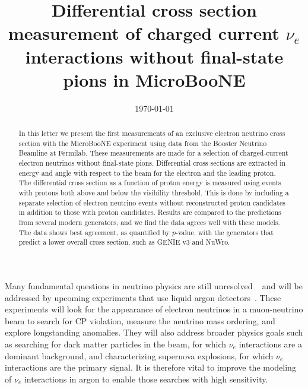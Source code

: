 \documentclass[reprint,
 amsmath,amssymb,
 aps,prd,
 superscriptaddress,
 twocolumn, longbibliography
]{revtex4-1}
\newcommand{\nue}{$\nu_e$\xspace}
\begin{document}
\title{Differential cross section measurement of charged current \nue interactions without final-state pions in MicroBooNE}



\date{\today}%

\begin{abstract}
In this letter we present the first measurements of an exclusive electron neutrino cross section with the MicroBooNE experiment using data from the Booster Neutrino Beamline at Fermilab. These measurements are made for a selection of charged-current electron neutrinos without final-state pions. Differential cross sections are extracted in energy and angle with respect to the beam for the electron and the leading proton.  The differential cross section as a function of proton energy is measured using events with protons both above and below the visibility threshold. This is done by including a separate selection of electron neutrino events without reconstructed proton candidates in addition to those with proton candidates.
Results are compared to the predictions from several modern generators, and we find the data agrees well with these models.  The data shows best agreement, as quantified by $p$-value, with the generators that predict a lower overall cross section,  such as GENIE v3 and NuWro.
\end{abstract}

\addtolength{\tabcolsep}{5pt}


\maketitle

Many fundamental questions in neutrino physics are still unresolved ~\cite{NuReview} and will be addressed by upcoming experiments that use liquid argon detectors~\cite{DUNE:2020ypp,SBN}. These experiments will look for the appearance of electron neutrinos in a muon-neutrino beam to search for CP violation, measure the neutrino mass ordering, and explore longstanding anomalies. They will also address broader physics goals such as searching for dark matter particles in the beam, for which $\nu_{e}$ interactions are a dominant background, and characterizing supernova explosions, for which $\nu_{e}$ interactions are the primary signal. It is therefore vital to improve the modeling of $\nu_{e}$ interactions in argon to enable those searches with high sensitivity.
\end{document}
